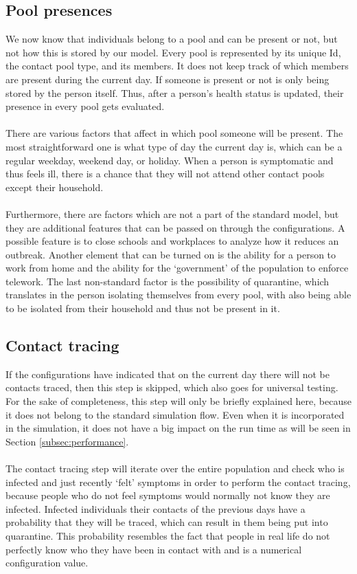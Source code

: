 \subsection{Pool presences}
\label{subsec:pool_presences}
We now know that individuals belong to a pool and can be present or not, but not how this is stored by our model. Every pool is represented by its unique Id, the contact pool type, and its members. It does not keep track of which members are present during the current day. If someone is present or not is only being stored by the person itself. Thus, after a person's health status is updated, their presence in every pool gets evaluated.
\\\\
There are various factors that affect in which pool someone will be present. The most straightforward one is what type of day the current day is, which can be a regular weekday, weekend day, or holiday. When a person is symptomatic and thus feels ill, there is a chance that they will not attend other contact pools except their household.
\\\\
Furthermore, there are factors which are not a part of the standard model, but they are additional features that can be passed on through the configurations. A possible feature is to close schools and workplaces to analyze how it reduces an outbreak. Another element that can be turned on is the ability for a person to work from home and the ability for the `government' of the population to enforce telework. The last non-standard factor is the possibility of quarantine, which translates in the person isolating themselves from every pool, with also being able to be isolated from their household and thus not be present in it.

\subsection{Contact tracing}
\label{subsec:contact_tracing}
If the configurations have indicated that on the current day there will not be contacts traced, then this step is skipped, which also goes for universal testing. For the sake of completeness, this step will only be briefly explained here, because it does not belong to the standard simulation flow. Even when it is incorporated in the simulation, it does not have a big impact on the run time as will be seen in Section \ref{subsec:performance}.
\\\\
The contact tracing step will iterate over the entire population and check who is infected and just recently `felt' symptoms in order to perform the contact tracing, because people who do not feel symptoms would normally not know they are infected. Infected individuals their contacts of the previous days have a probability that they will be traced, which can result in them being put into quarantine. This probability resembles the fact that people in real life do not perfectly know who they have been in contact with and is a numerical configuration value.


